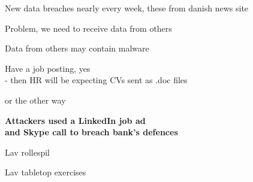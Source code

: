 \documentclass[Screen16to9,17pt]{foils}
\begin{document}


New data breaches nearly every week, these from danish news site 

Problem, we need to receive data from others

Data from others may contain malware

Have a job posting, yes\\
- then HR will be expecting CVs sent as .doc files

\slide{}

or the other way

{\Large\bf Attackers used a LinkedIn job ad\\
and Skype call to breach bank’s defences}

{\footnotesize
{}}


\begin{list2}
\item Lav rollespil
\item Lav tabletop exercises
\end{list2}



\begin{center}
\hlkbig

\myname

\end{center}
\end{document}

